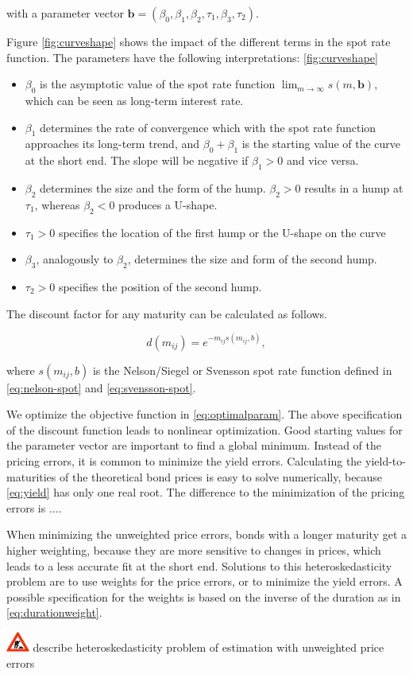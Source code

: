with a parameter vector ${\bm{b}} = \left(\beta_0,\beta_1,\beta_2,\tau_1,\beta_3,\tau_2\right)$.

Figure \ref{fig:curveshape} shows the impact of the different terms in the spot rate function. The parameters have the following interpretations: \ref{fig:curveshape}

\begin{itemize}
\item $\beta_0$ is the asymptotic value of the spot rate function $\lim_{m\to\infty}s(m,\bm{b})$, which can be seen as long-term interest rate.
\item $\beta_1$ determines the rate of convergence which with the spot rate function approaches its long-term trend, and $\beta_0+\beta_1$ is the starting value of the curve at the short end. The slope will be negative if $\beta_1>0$ and vice versa.
\item $\beta_2$ determines the size and the form of the hump. $\beta_2 >0$  results in a hump at  $\tau_1$, whereas $\beta_2<0$ produces a U-shape.
\item $\tau_1>0$ specifies the location of the first hump or the U-shape on the curve
\item $\beta_3$, analogously to $\beta_2$, determines the size and form of the second hump.
\item $\tau_2>0$ specifies the position of the second hump.
\end{itemize}

The discount factor for any maturity can be calculated as follows. 

\begin{displaymath}
d(m_{ij})=e^{-m_{ij}s(m_{ij},b)},
\end{displaymath}

where $s(m_{ij},b)$ is the Nelson/Siegel or Svensson spot rate function defined in \eqref{eq:nelson-spot} and \eqref{eq:svensson-spot}.

We optimize the objective function in \eqref{eq:optimalparam}. The above specification of the discount function leads to nonlinear optimization. Good starting values for the parameter vector are important to find a global minimum. Instead of the pricing errors, it is common to minimize the yield errors. Calculating the yield-to-maturities of the theoretical bond prices is easy to solve numerically, because \eqref{eq:yield} has only one real root. The difference to the minimization of the pricing errors is $\dots$.

When minimizing the unweighted price errors, bonds with a longer maturity get a higher weighting, because they are more sensitive to changes in prices, which leads to a less accurate fit at the short end. Solutions to this heteroskedasticity problem are to use weights for the price errors, or to minimize the yield errors. A possible specification for the weights is based on the inverse of the duration as in \eqref{eq:durationweight}.

\includegraphics[width=0.3in]{baustelle} describe heteroskedasticity problem of estimation with unweighted price errors

